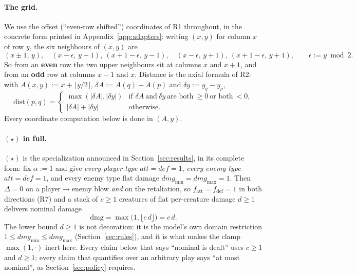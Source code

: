 \documentclass[11pt,a4paper]{article}
\theoremstyle{plain}
\theoremstyle{definition}
\theoremstyle{plain}
\theoremstyle{definition}
\theoremstyle{remark}
\begin{document}
\paragraph{The grid.} We use the offset (``even-row shifted'') coordinates of R1
throughout, in the concrete form printed in Appendix~\ref{app:adapters}: writing $(x,y)$
for column $x$ of row $y$, the six neighbours of $(x,y)$ are
\[
  (x\pm 1,\,y),\quad (x-\epsilon,\,y-1),\ (x+1-\epsilon,\,y-1),\quad
  (x-\epsilon,\,y+1),\ (x+1-\epsilon,\,y+1),
  \qquad \epsilon:=y\bmod 2 .
\]
So from an \textbf{even} row the two upper neighbours sit at columns $x$ and $x+1$, and
from an \textbf{odd} row at columns $x-1$ and $x$. Distance is the axial formula of R2:
with $A(x,y):=x+\lfloor y/2\rfloor$, $\delta A:=A(q)-A(p)$ and $\delta y:=y_q-y_p$,
\begin{equation*}
  \mathrm{dist}(p,q)=
  \begin{cases}
    \max(|\delta A|,|\delta y|) & \text{if } \delta A\ \text{and}\ \delta y\
      \text{are both}\ \ge 0\ \text{or both}\ <0,\\[2pt]
    |\delta A|+|\delta y| & \text{otherwise.}
  \end{cases}
  \tag{R2}
\end{equation*}
Every coordinate computation below is done in $(A,y)$.

\paragraph{$(\star)$ in full.} $(\star)$ is the specialization announced in
Section~\ref{sec:results}, in its complete form: fix $\alpha:=1$ and give
\emph{every player type} $\mathit{att}=\mathit{def}=1$, \emph{every enemy type}
$\mathit{att}=\mathit{def}=1$, and every enemy type flat damage
$\mathit{dmg}_{\min}=\mathit{dmg}_{\max}=1$. Then $\Delta=0$ on a player$\to$enemy blow
\emph{and} on the retaliation, so $f_{\mathrm{att}}=f_{\mathrm{def}}=1$ in both directions
(R7) and a stack of $c\ge 1$ creatures of flat per-creature damage $d\ge 1$ delivers
nominal damage
\begin{equation*}
  \mathrm{dmg}=\max\bigl(1,\lfloor c\,d\rfloor\bigr)=c\,d .
  \tag{$\star$}
\end{equation*}
The lower bound $d\ge 1$ is not decoration: it is the model's own domain restriction
$1\le\mathit{dmg}_{\min}\le\mathit{dmg}_{\max}$ (Section~\ref{sec:rules}), and it is what
makes the clamp $\max(1,\cdot)$ inert here. Every claim below that says ``nominal is
dealt'' uses $c\ge 1$ and $d\ge 1$; every claim that quantifies over an arbitrary play says
``at most nominal'', as Section~\ref{sec:policy} requires.
\end{document}
